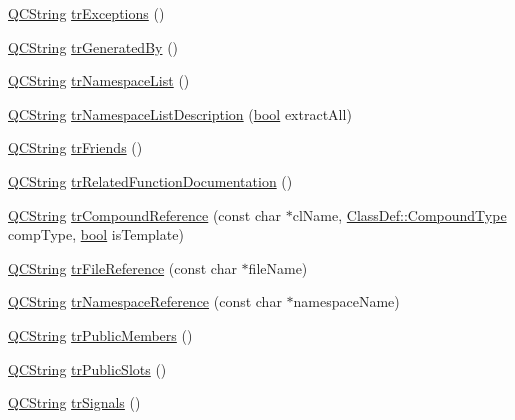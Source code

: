 \begin{DoxyCompactItemize}
\item 
\hyperlink{class_q_c_string}{Q\+C\+String} \hyperlink{class_translator_italian_a031a42a99a64a7c806bd6ce0c26e65e6}{tr\+Exceptions} ()
\item 
\hyperlink{class_q_c_string}{Q\+C\+String} \hyperlink{class_translator_italian_a3e56a91fa81539a017863f6ef9d4b5d6}{tr\+Generated\+By} ()
\item 
\hyperlink{class_q_c_string}{Q\+C\+String} \hyperlink{class_translator_italian_a3c1e6c0da10511984e141019a7b8fc39}{tr\+Namespace\+List} ()
\item 
\hyperlink{class_q_c_string}{Q\+C\+String} \hyperlink{class_translator_italian_afbe98c322ec04c2abeb7f6285a5820ea}{tr\+Namespace\+List\+Description} (\hyperlink{qglobal_8h_a1062901a7428fdd9c7f180f5e01ea056}{bool} extract\+All)
\item 
\hyperlink{class_q_c_string}{Q\+C\+String} \hyperlink{class_translator_italian_a0d67545dafd0468934dc6b10a3dc5fad}{tr\+Friends} ()
\item 
\hyperlink{class_q_c_string}{Q\+C\+String} \hyperlink{class_translator_italian_aaf7223507091afa2feb47872a7cf6d4d}{tr\+Related\+Function\+Documentation} ()
\item 
\hyperlink{class_q_c_string}{Q\+C\+String} \hyperlink{class_translator_italian_abfa7be36cc267c88e65de4a1f09917ee}{tr\+Compound\+Reference} (const char $\ast$cl\+Name, \hyperlink{class_class_def_ae70cf86d35fe954a94c566fbcfc87939}{Class\+Def\+::\+Compound\+Type} comp\+Type, \hyperlink{qglobal_8h_a1062901a7428fdd9c7f180f5e01ea056}{bool} is\+Template)
\item 
\hyperlink{class_q_c_string}{Q\+C\+String} \hyperlink{class_translator_italian_aa335f444123ee1e447559746c8a41cd1}{tr\+File\+Reference} (const char $\ast$file\+Name)
\item 
\hyperlink{class_q_c_string}{Q\+C\+String} \hyperlink{class_translator_italian_a5d22c0f0c87bf72f003f810a5e528957}{tr\+Namespace\+Reference} (const char $\ast$namespace\+Name)
\item 
\hyperlink{class_q_c_string}{Q\+C\+String} \hyperlink{class_translator_italian_ad732f11385727766f602edc0222ce390}{tr\+Public\+Members} ()
\item 
\hyperlink{class_q_c_string}{Q\+C\+String} \hyperlink{class_translator_italian_a4a80e1ca3f5d7561d7bf17ffca0c7b5a}{tr\+Public\+Slots} ()
\item 
\hyperlink{class_q_c_string}{Q\+C\+String} \hyperlink{class_translator_italian_a23718692e1caa7ec3998b7082df767e7}{tr\+Signals} ()
\item 

\end{DoxyCompactItemize}

